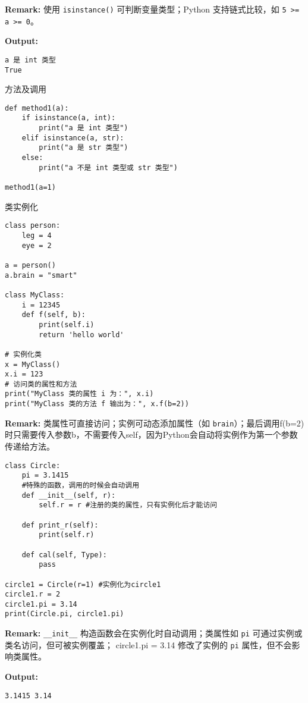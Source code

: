 \documentclass{article}
\begin{document}
\textbf{Remark:} 使用 \texttt{isinstance()} 可判断变量类型；Python 支持链式比较，如 \texttt{5 >= a >= 0}。

\textbf{Output:}
\begin{verbatim}
a 是 int 类型
True
\end{verbatim}

方法及调用

\begin{lstlisting}
def method1(a):
    if isinstance(a, int):
        print("a 是 int 类型")
    elif isinstance(a, str):
        print("a 是 str 类型")
    else:
        print("a 不是 int 类型或 str 类型")

method1(a=1)
\end{lstlisting}

类实例化

\begin{lstlisting}
class person:
    leg = 4
    eye = 2

a = person()
a.brain = "smart"

class MyClass:
    i = 12345
    def f(self, b):
        print(self.i)
        return 'hello world'

# 实例化类
x = MyClass()
x.i = 123
# 访问类的属性和方法
print("MyClass 类的属性 i 为：", x.i)
print("MyClass 类的方法 f 输出为：", x.f(b=2))
\end{lstlisting}

\textbf{Remark:}  
类属性可直接访问；实例可动态添加属性（如 \texttt{brain}）；最后调用f(b=2)时只需要传入参数b，不需要传入self，因为Python会自动将实例作为第一个参数传递给方法。

\begin{lstlisting}
class Circle:
    pi = 3.1415
    #特殊的函数，调用的时候会自动调用
    def __init__(self, r):
        self.r = r #注册的类的属性，只有实例化后才能访问

    def print_r(self):
        print(self.r)

    def cal(self, Type):
        pass

circle1 = Circle(r=1) #实例化为circle1
circle1.r = 2
circle1.pi = 3.14
print(Circle.pi, circle1.pi)
\end{lstlisting}

\textbf{Remark:}  
\texttt{\_\_init\_\_} 构造函数会在实例化时自动调用；类属性如 \texttt{pi} 可通过实例或类名访问，但可被实例覆盖； circle1.pi = 3.14 修改了实例的 \texttt{pi} 属性，但不会影响类属性。

\textbf{Output:}
\begin{verbatim}
3.1415 3.14
\end{verbatim}
\end{document}

